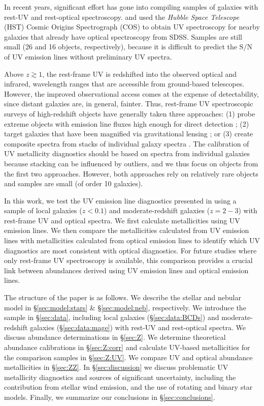 \documentclass[preprint2]{aastex62}
\newcommand{\SN}{\ensuremath{\mathrm{S}/\mathrm{N}}\xspace}
\begin{document}
In recent years, significant effort has gone into compiling samples of galaxies with rest-UV and rest-optical spectroscopy. \citet{Berg+2016, Berg+2019} and \citet{Senchyna+2017, Senchyna+2019} used the \emph{Hubble Space Telescope} (HST) Cosmic Origins Spectrograph (COS) to obtain UV spectroscopy for nearby galaxies that already have optical spectroscopy from SDSS. Samples are still small (26 and 16 objects, respectively), because it is difficult to predict the \SN of UV emission lines without preliminary UV spectra. 


Above $z\gtrsim 1$, the rest-frame UV is redshifted into the observed optical and infrared, wavelength ranges that are accessible from ground-based telescopes. However, the improved observational access comes at the expense of detectability, since distant galaxies are, in general, fainter. Thus, rest-frame UV spectroscopic surveys of high-redshift objects have generally taken three approaches: (1) probe extreme objects with emission line fluxes high enough for direct detection \citep[e.g., ][]{Erb+2010, Stark+2014}; (2) target galaxies that have been magnified via gravitational lensing \citep[e.g.,][]{Bayliss+2014, Rigby+2018a}; or (3) create composite spectra from stacks of individual galaxy spectra \citep[e.g.,][]{Shapley+2003, Steidel+2016}. The calibration of UV metallicity diagnostics should be based on spectra from individual galaxies because stacking can be influenced by outliers, and we thus focus on objects from the first two approaches. However, both approaches rely on relatively rare objects and samples are small (of order 10 galaxies).

In this work, we test the UV emission line diagnostics presented in \citet{Byler+2018} using a sample of local galaxies ($z < 0.1$) and moderate-redshift galaxies ($z=2-3$) with rest-frame UV and optical spectra. We first calculate metallicities using UV emission lines. We then compare the metallicities calculated from UV emission lines with metallicities calculated from optical emission lines to identify which UV diagnostics are most consistent with optical diagnostics. For future studies where only rest-frame UV spectroscopy is available, this comparison provides a crucial link between abundances derived using UV emission lines and optical emission lines.

The structure of the paper is as follows. We describe the stellar and nebular model in \S\ref{sec:model:stars} \& \S\ref{sec:model:neb}, respectively. We introduce the sample in \S\ref{sec:data}, including local galaxies (\S\ref{sec:data:BCDs}) and moderate-redshift galaxies (\S\ref{sec:data:mage}) with rest-UV and rest-optical spectra. We discuss abundance determinations in \S\ref{sec:Z}. We determine theoretical abundance calibrations in \S\ref{sec:Z:corr} and calculate UV-based metallicities for the comparison samples in \S\ref{sec:Z:UV}. We compare UV and optical abundance metallicities in \S\ref{sec:ZZ}. In \S\ref{sec:discussion} we discuss problematic UV metallicity diagnostics and sources of significant uncertainty, including the contribution from stellar wind emission, and the use of rotating and binary star models. Finally, we summarize our conclusions in \S\ref{sec:conclusions}.
\end{document}
